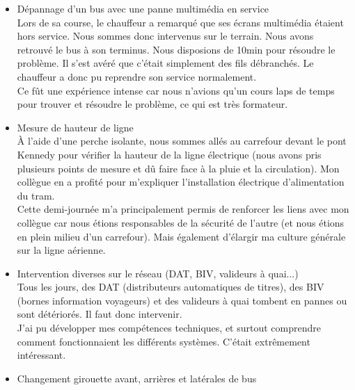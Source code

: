 \documentclass{article}
\begin{document}
\begin{itemize}
            Cette demi-journée m'a permis d'avoir un rappel d'électricité sur l'intérêt 
            des onduleurs pour les batteries, mais aussi d'élargir ma culture générale
            sur la très haute tension.
            \item Dépannage d'un bus avec une panne multimédia en service\\
            Lors de sa course, le chauffeur a remarqué que ses écrans multimédia 
            étaient hors service. Nous sommes donc intervenus sur le terrain. Nous 
            avons retrouvé le bus à son terminus. Nous disposions de 10min pour 
            résoudre le problème. Il s'est avéré que c'était simplement des fils 
            débranchés. Le chauffeur a donc pu reprendre son service normalement. \\
            Ce fût une expérience intense car nous n'avions qu'un cours laps de temps pour 
            trouver et résoudre le problème, ce qui est très formateur.
            \item Mesure de hauteur de ligne\\
            \`A l'aide d'une perche isolante, nous sommes allés au carrefour 
            devant le pont Kennedy pour vérifier la hauteur de la ligne 
            électrique (nous avons pris plusieurs points de mesure et dû faire 
            face à la pluie et la circulation). Mon collègue en a profité pour
            m'expliquer l'installation électrique d'alimentation du tram. \\
            Cette demi-journée m'a principalement permis de renforcer les liens avec 
            mon collègue car nous étions responsables de la sécurité de l'autre (et nous
            étions en plein milieu d'un carrefour). Mais également d'élargir ma culture 
            générale sur la ligne aérienne.
            \item Intervention diverses sur le réseau (DAT, BIV, valideurs à quai...)\\
            Tous les jours, des DAT (distributeurs automatiques de titres), des BIV 
            (bornes information voyageurs) et des valideurs à quai tombent en 
            pannes ou sont détériorés. Il faut donc intervenir. \\
            J'ai pu développer mes compétences techniques, et surtout comprendre comment 
            fonctionnaient les différents systèmes. C'était extrêmement intéressant.
            \item Changement girouette avant, arrières et latérales de bus\\

\end{itemize}
\end{document}
